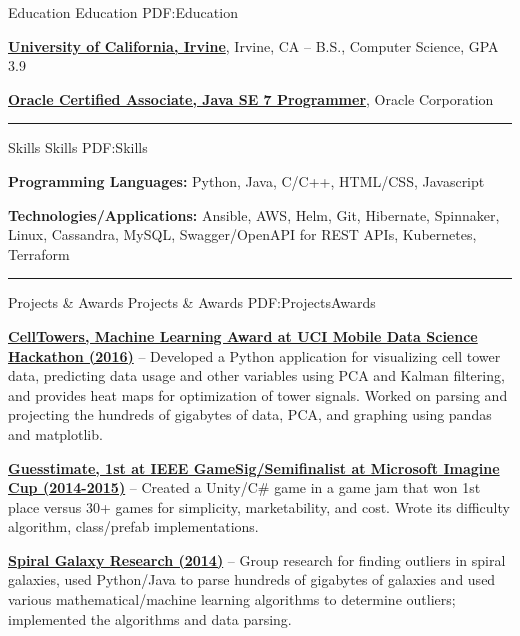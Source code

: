 \documentclass[letterpaper,MMMyyyy,nonstopmode]{simpleresumecv}
\begin{document}
\begin{Body}

	\Section
	{Education}
	{Education}
	{PDF:Education}

	\Entry
	\href{https://uci.edu/}
	{\textbf{University of California, Irvine}},
	Irvine, CA
	\hfill
	 --
	\Gap
	B.S., Computer Science, GPA 3.9\newline

	\Entry
	\href{http://education.oracle.com/pls/web_prod-plq-dad/db_pages.getpage?page_id=5001&get_params=p_exam_id:1Z0-803&p_org_id=&lang=}
	{\textbf{Oracle Certified Associate, Java SE 7 Programmer}},
	Oracle Corporation
	\hfill
	\newline
	\Gap

	\hrule


	\Section
	{Skills}
	{Skills}
	{PDF:Skills}

	\begin{flushleft}
		\textbf{Programming Languages:} Python, Java, C/C++, HTML/CSS, Javascript\newline

		\textbf{Technologies/Applications:} Ansible, AWS, Helm, Git, Hibernate, Spinnaker, 
		Linux, Cassandra, MySQL, Swagger/OpenAPI for REST APIs, Kubernetes, Terraform \newline
	\end{flushleft}

	\hrule


	\Section
	{Projects \& Awards}
	{Projects \& Awards}
	{PDF:ProjectsAwards}

	\Entry
	\href{https://github.com/trizzle21/Datathon2016}
	{\textbf{CellTowers, Machine Learning Award at UCI Mobile Data Science Hackathon (2016)}} -- Developed a Python application for visualizing cell tower data, predicting data usage and other variables using PCA and Kalman filtering, and provides heat maps for optimization of tower signals. Worked on parsing and projecting the hundreds of gigabytes of data, PCA, and graphing using pandas and matplotlib.\newline

	\Entry
	\href{https://github.com/brendonwai/PAS}
	{\textbf{Guesstimate, 1st at IEEE GameSig/Semifinalist at Microsoft Imagine Cup (2014-2015)}} -- Created a Unity/C\# game in a game jam that won 1st place versus 30+ games for simplicity, marketability, and cost. Wrote its difficulty algorithm, class/prefab implementations.\newline

	\Entry
	\href{https://github.com/SVT125/Research-CS199}
	{\textbf{Spiral Galaxy Research (2014)}} -- Group research for finding outliers in spiral galaxies, used Python/Java to parse hundreds of gigabytes of galaxies and used various mathematical/machine learning algorithms to determine outliers; implemented the algorithms and data parsing.\newline

\end{Body}
\end{document}
